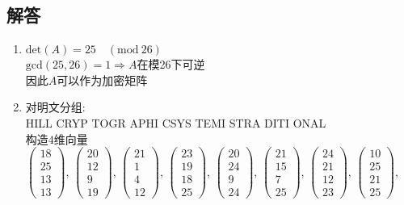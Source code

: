 \documentclass[12pt]{article}
\begin{document}
\subsection*{解答}
\begin{enumerate}
\item 
$\textrm{det}(A)=25\quad(\mathrm{mod}~26)$\\
$\mathrm{gcd}(25, 26)=1\Longrightarrow A$在模26下可逆\\
因此$A$可以作为加密矩阵\\

\item
对明文分组:\\
HILL CRYP TOGR APHI CSYS TEMI STRA DITI ONAL\\
构造$4$维向量\\
$\begin{pmatrix}18\\25\\13\\13\end{pmatrix}$,
$\begin{pmatrix}20\\12\\9\\19\end{pmatrix}$,
$\begin{pmatrix}21\\1\\4\\12\end{pmatrix}$,
$\begin{pmatrix}23\\19\\18\\25\end{pmatrix}$,
$\begin{pmatrix}20\\24\\9\\24\end{pmatrix}$,
$\begin{pmatrix}21\\15\\7\\25\end{pmatrix}$,
$\begin{pmatrix}24\\21\\12\\23\end{pmatrix}$,
$\begin{pmatrix}10\\25\\21\\25\end{pmatrix}$,

\end{enumerate}
\end{document}

